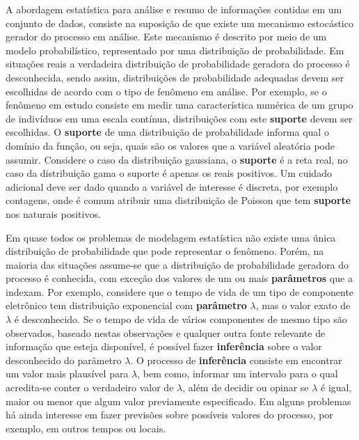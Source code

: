 \documentclass[
  9pt,
  a5paper,
]{book}
\theoremstyle{definition}
\theoremstyle{definition}
\theoremstyle{definition}
\theoremstyle{definition}
\theoremstyle{remark}
\begin{document}
A abordagem estatística para análise e resumo de informações contidas em um conjunto de dados, consiste na suposição de que existe um mecanismo estocástico gerador do processo em análise. Este mecanismo é descrito por meio de um modelo probabilístico, representado por uma distribuição de probabilidade. Em situações reais a verdadeira distribuição de probabilidade geradora do processo é desconhecida, sendo assim, distribuições de probabilidade adequadas devem ser escolhidas de acordo com o tipo de fenômeno em análise. Por exemplo, se o fenômeno em estudo consiste em medir uma característica numérica de um grupo de indivíduos em uma escala contínua, distribuições com este \textbf{suporte} devem ser escolhidas.
O \textbf{suporte} de uma distribuição de probabilidade informa qual o domínio da função, ou seja, quais são os valores que a variável aleatória pode assumir.
Considere o caso da distribuição gaussiana, o \textbf{suporte} é a reta real, no caso da distribuição gama o suporte é apenas os reais positivos.
Um cuidado adicional deve ser dado quando a variável de interesse é discreta, por exemplo contagens, onde é comum atribuir uma distribuição de Poisson que tem \textbf{suporte} nos naturais positivos.

Em quase todos os problemas de modelagem estatística não existe uma única distribuição de probabilidade que pode representar o fenômeno.
Porém, na maioria das situações assume-se que a distribuição de probabilidade geradora do processo é conhecida, com exceção dos valores de um ou mais \textbf{parâmetros} que a indexam.
Por exemplo, considere que o tempo de vida de um tipo de componente eletrônico tem distribuição exponencial com \textbf{parâmetro} \(\lambda\), mas o valor exato de \(\lambda\) é desconhecido. Se o tempo de vida de vários componentes de mesmo tipo são observados, baseado nestas observações e qualquer outra fonte relevante de informação que esteja disponível, é possível fazer \textbf{inferência} sobre o valor desconhecido do parâmetro \(\lambda\).
O processo de \textbf{inferência} consiste em encontrar um valor mais plausível para \(\lambda\), bem como, informar um intervalo para o qual acredita-se conter o verdadeiro valor de \(\lambda\), além de decidir ou opinar se \(\lambda\) é igual, maior ou menor que algum valor previamente especificado.
Em alguns problemas há ainda interesse em fazer previsões sobre possíveis valores do processo, por exemplo, em outros tempos ou locais.
\end{document}
